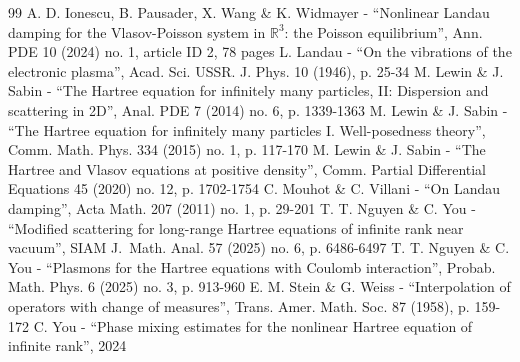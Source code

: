 \begin{thebibliography}{99}
 A. D. Ionescu, B. Pausader, X. Wang \& K. Widmayer - “Nonlinear Landau damping for the Vlasov-Poisson system in $\mathbb{R}^3$: the Poisson equilibrium”, Ann. PDE 10 (2024) no. 1, article ID 2, 78 pages
 L. Landau - “On the vibrations of the electronic plasma”, Acad. Sci. USSR. J. Phys. 10 (1946), p. 25-34
 M. Lewin \& J. Sabin - “The Hartree equation for infinitely many particles, II: Dispersion and scattering in 2D”, Anal. PDE 7 (2014) no. 6, p. 1339-1363
 M. Lewin \& J. Sabin - “The Hartree equation for infinitely many particles I. Well-posedness theory”, Comm. Math. Phys. 334 (2015) no. 1, p. 117-170
 M. Lewin \& J. Sabin - “The Hartree and Vlasov equations at positive density”, Comm. Partial Differential Equations 45 (2020) no. 12, p. 1702-1754
 C. Mouhot \& C. Villani - “On Landau damping”, Acta Math. 207 (2011) no. 1, p. 29-201
 T. T. Nguyen \& C. You - “Modified scattering for long-range Hartree equations of infinite rank near vacuum”, SIAM J. Math. Anal. 57 (2025) no. 6, p. 6486-6497
 T. T. Nguyen \& C. You - “Plasmons for the Hartree equations with Coulomb interaction”, Probab. Math. Phys. 6 (2025) no. 3, p. 913-960
 E. M. Stein \& G. Weiss - “Interpolation of operators with change of measures”, Trans. Amer. Math. Soc. 87 (1958), p. 159-172
 C. You - “Phase mixing estimates for the nonlinear Hartree equation of infinite rank”, 2024
\end{thebibliography}

